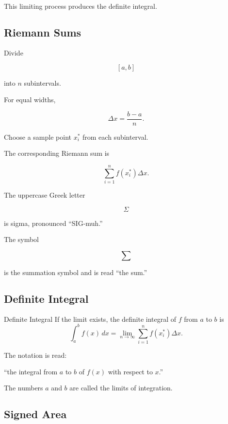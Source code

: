 This limiting process produces the definite integral.

\subsection{Riemann Sums}
\label{subsec:riemann-sums}

Divide

\[ [a,b] \]

into \(n\) subintervals.

For equal widths,

\[ \Delta x=\frac{b-a}{n}. \]

Choose a sample point \(x_i^*\) from each subinterval.

The corresponding Riemann sum is

\[ \sum_{i=1}^{n}f(x_i^*)\Delta x. \]

The uppercase Greek letter

\[ \Sigma \]

is sigma, pronounced ``SIG-muh.''

The symbol

\[ \sum \]

is the summation symbol and is read ``the sum.''

\subsection{Definite Integral}
\label{subsec:definite-integral}

\begin{definitionbox}{Definite Integral}
If the limit exists, the definite integral of \(f\) from \(a\) to \(b\) is
\[ \int_a^b f(x)\,dx
=
\lim_{n\to\infty}
\sum_{i=1}^{n}f(x_i^*)\Delta x. \]
\end{definitionbox}

The notation is read:

``the integral from \(a\) to \(b\) of \(f(x)\) with respect to \(x\).''

The numbers \(a\) and \(b\) are called the limits of integration.

\subsection{Signed Area}
\label{subsec:signed-area}

